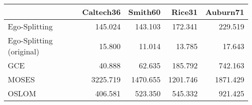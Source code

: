 \begin{tabular}{lrrrr}
\toprule
{} & Caltech36 &  Smith60 &   Rice31 & Auburn71 \\
\midrule
Ego-Splitting            &   145.024 &  143.103 &  172.341 &  229.519 \\
Ego-Splitting (original) &    15.800 &   11.014 &   13.785 &   17.643 \\
GCE                      &    40.888 &   62.635 &  185.792 &  742.163 \\
MOSES                    &  3225.719 & 1470.655 & 1201.746 & 1871.429 \\
OSLOM                    &   406.581 &  523.350 &  545.332 &  921.425 \\
\bottomrule
\end{tabular}
